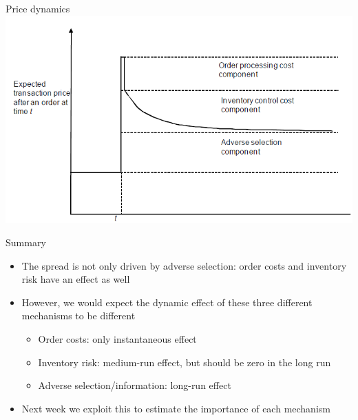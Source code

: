 \documentclass[english,10pt
,aspectratio=169
]{beamer}
\begin{document}
\begin{frame}{Price dynamics}
	\includegraphics[width=0.9\linewidth]{pics/PriceDiscovery_Image}
\end{frame}


\begin{frame}{Summary}
	\begin{itemize}
		\item The spread is not only driven by adverse selection: order costs and inventory risk have an effect as well
		\item However, we would expect the dynamic effect of these three different mechanisms to be different
		\begin{itemize}
			\item Order costs: only instantaneous effect 
			\item Inventory risk: medium-run effect, but should be zero in the long run
			\item Adverse selection/information: long-run effect 
		\end{itemize}
		\item Next week we exploit this to estimate the importance of each mechanism
	\end{itemize}
\end{frame}
\end{document}

